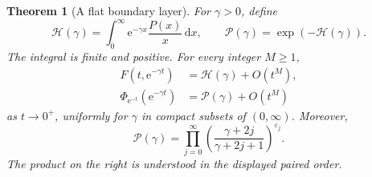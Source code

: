 \documentclass[11pt,a4paper,oneside,openany]{book}
\numberwithin{equation}{chapter}
\newtheorem{theorem}{Theorem}[chapter]
\theoremstyle{definition}
\theoremstyle{remark}
\newcommand{\eps}{\varepsilon}
\newcommand{\dd}{\,\mathrm d}
\newcommand{\e}{\mathrm e}
\begin{document}
\begin{theorem}[A flat boundary layer]
\label{nd:thm:boundarylayer}
For \(\gamma>0\), define
\begin{equation}
 \mathcal H(\gamma)=\int_0^\infty\e^{-\gamma x}\frac{P(x)}x\dd x,
 \qquad \mathcal P(\gamma)=\exp(-\mathcal H(\gamma)).
 \label{nd:eq:Hgamma}
\end{equation}
The integral is finite and positive. For every integer \(M\ge1\),
\begin{align}
 F(t,\e^{-\gamma t})&=\mathcal H(\gamma)+O(t^M),
 \label{nd:eq:boundaryF}\\
 \Phi_{\e^{-t}}(\e^{-\gamma t})&=\mathcal P(\gamma)+O(t^M)
 \label{nd:eq:boundaryPhi}
\end{align}
as \(t\to0^+\), uniformly for \(\gamma\) in compact subsets of
\((0,\infty)\). Moreover,
\begin{equation}
 \mathcal P(\gamma)=
 \prod_{j=0}^{\infty}
      \left(\frac{\gamma+2j}{\gamma+2j+1}\right)^{\eps_j}.
 \label{nd:eq:Pclassical}
\end{equation}
The product on the right is understood in the displayed paired order.
\end{theorem}
\end{document}
